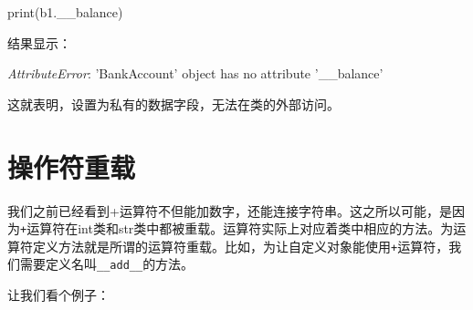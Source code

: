 \documentclass[]{ctexbook}
\newenvironment{Shaded}{\begin{snugshade}}{\end{snugshade}}
\newcommand{\BuiltInTok}[1]{#1}
\newcommand{\NormalTok}[1]{#1}
\newcommand{\PreprocessorTok}[1]{\textcolor[rgb]{0.56,0.35,0.01}{\textit{#1}}}
\newcommand{\StringTok}[1]{\textcolor[rgb]{0.31,0.60,0.02}{#1}}
\begin{document}
\begin{Shaded}
\begin{Highlighting}[]
\BuiltInTok{print}\NormalTok{(b1.__balance)}
\end{Highlighting}
\end{Shaded}

结果显示：

\begin{Shaded}
\begin{Highlighting}[]
\PreprocessorTok{AttributeError}\NormalTok{: }\StringTok{'BankAccount'} \BuiltInTok{object}\NormalTok{ has no attribute }\StringTok{'__balance'}
\end{Highlighting}
\end{Shaded}

这就表明，设置为私有的数据字段，无法在类的外部访问。

\hypertarget{ux64cdux4f5cux7b26ux91cdux8f7d}{%
\section{操作符重载}\label{ux64cdux4f5cux7b26ux91cdux8f7d}}

我们之前已经看到+运算符不但能加数字，还能连接字符串。这之所以可能，是因为\texttt{+}运算符在int类和str类中都被重载。运算符实际上对应着类中相应的方法。为运算符定义方法就是所谓的运算符重载。比如，为让自定义对象能使用\texttt{+}运算符，我们需要定义名叫\texttt{\_\_add\_\_}的方法。

让我们看个例子：
\end{document}
